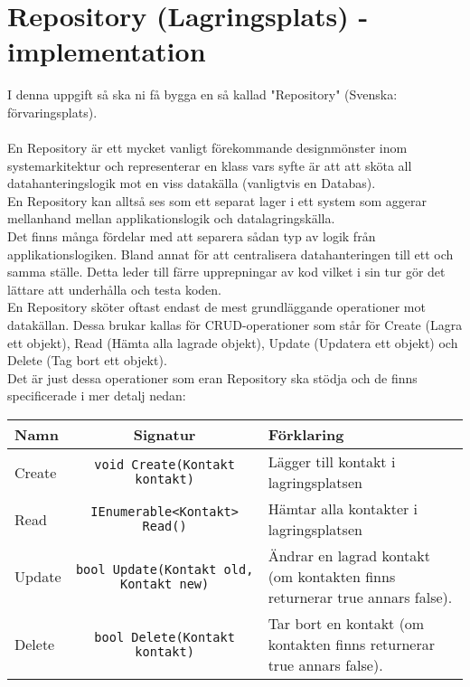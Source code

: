 \documentclass{article}
\begin{document}
  \section*{Repository (Lagringsplats) - implementation}
I denna uppgift så ska ni få bygga en så kallad "Repository" (Svenska: förvaringsplats). \\ \\ En Repository är ett mycket vanligt förekommande designmönster inom systemarkitektur och representerar en klass vars syfte är att att sköta all datahanteringslogik mot en viss datakälla (vanligtvis en Databas). \\

En Repository kan alltså ses som ett separat lager i ett system som aggerar mellanhand mellan applikationslogik och datalagringskälla. \\

Det finns många fördelar med att separera sådan typ av logik från applikationslogiken. Bland annat för att centralisera datahanteringen till ett och samma ställe. Detta leder till färre upprepningar av kod vilket i sin tur gör det 
lättare att underhålla och testa koden. \\

En Repository sköter oftast endast de mest grundläggande operationer mot datakällan. Dessa brukar kallas för CRUD-operationer som står för Create (Lagra ett objekt), Read (Hämta alla lagrade objekt), Update (Updatera ett objekt) och Delete (Tag bort ett objekt). \\

Det är just dessa operationer som eran Repository ska stödja och de finns specificerade i mer detalj nedan: \\
  
  \begin{center}
  \renewcommand{\arraystretch}{1.5}
    \begin{tabular}{ l | c | p{5cm}}
    
      
      \textbf{Namn} & \textbf{Signatur} & \textbf{Förklaring} \\ \hline
      Create & \texttt{void Create(Kontakt kontakt)}& Lägger till kontakt i lagringsplatsen\\ 
      Read & \texttt{IEnumerable<Kontakt> Read()} & Hämtar alla kontakter i lagringsplatsen \\
      Update & \texttt{bool Update(Kontakt old, Kontakt new)} & Ändrar en lagrad kontakt (om kontakten finns returnerar true annars false). \\ 
      Delete & \texttt{bool Delete(Kontakt kontakt)} & Tar bort en kontakt (om kontakten finns returnerar true annars false).\\
      \hline
    \end{tabular}
  \end{center}
  
\end{document}
